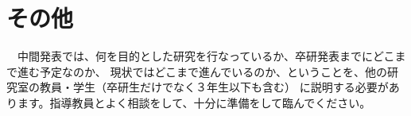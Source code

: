 \documentclass[10pt]{article}
\begin{document}
    
    \section{{\normalsize その他}}
    　中間発表では、何を目的とした研究を行なっているか、卒研発表までにどこまで進む予定なのか、
    現状ではどこまで進んでいるのか、ということを、他の研究室の教員・学生（卒研生だけでなく３年生以下も含む）
    に説明する必要があります。指導教員とよく相談をして、十分に準備をして臨んでください。
    
    
    
    
\end{document}
